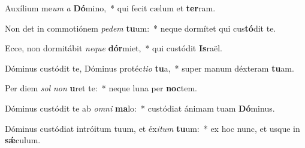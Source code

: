 \item Auxílium me\textit{um} \textit{a} \textbf{Dó}mino,~* qui fecit cælum et \textbf{ter}ram.
\item Non det in commotiónem \textit{pe}\textit{dem} \textbf{tu}um:~* neque dormítet qui cus\textbf{tó}dit te.
\item Ecce, non dormitábit \textit{ne}\textit{que} \textbf{dór}miet,~* qui custódit \textbf{Is}raël.
\item Dóminus custódit te, Dóminus protéc\textit{ti}\textit{o} \textbf{tu}a,~* super manum déxteram \textbf{tu}am.
\item Per diem \textit{sol} \textit{non} \textbf{u}ret te:~* neque luna per \textbf{noc}tem.
\item Dóminus custódit te ab \textit{om}\textit{ni} \textbf{ma}lo:~* custódiat ánimam tuam \textbf{Dó}minus.
\item Dóminus custódiat intróitum tuum, et éx\textit{i}\textit{tum} \textbf{tu}um:~* ex hoc nunc, et usque in \textbf{sǽ}culum.

